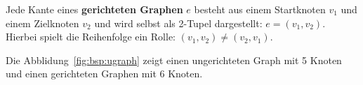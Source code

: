 \begin{mdef}
Jede Kante eines \textbf{gerichteten Graphen} $e$ besteht aus einem Startknoten $v_1$ und einem Zielknoten $v_2$ und wird selbst als 2-Tupel dargestellt: $e= (v_1,v_2)$. 
Hierbei spielt die Reihenfolge ein Rolle: $(v_1,v_2) \neq (v_2,v_1)$. 
\end{mdef}


\begin{mbsp}
Die Abblidung~\ref{fig:bsp:ugraph} zeigt einen ungerichteten Graph mit 5 Knoten und einen gerichteten Graphen mit 6 Knoten. 
\end{mbsp}

